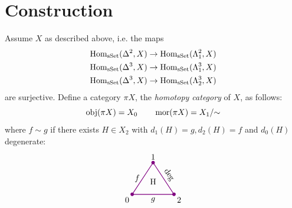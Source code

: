     \section{Construction}
        Assume $X$ as described above, i.e. the maps
        \begin{gather*}
            \operatorname{Hom}_{\operatorname{sSet}}(\Delta^2, X) \to \operatorname{Hom}_{\operatorname{sSet}}(\Lambda^{2}_{1}, X) \\
            \operatorname{Hom}_{\operatorname{sSet}}(\Delta^3, X) \to \operatorname{Hom}_{\operatorname{sSet}}(\Lambda^{3}_{1}, X) \\
            \operatorname{Hom}_{\operatorname{sSet}}(\Delta^3, X) \to \operatorname{Hom}_{\operatorname{sSet}}(\Lambda^{3}_{2}, X)
        \end{gather*}
        are surjective.
        Define a category $\pi X$, the \emph{homotopy category} of $X$, as follows:
        \begin{equation*}
            \operatorname{obj}(\pi X) = X_0 \qquad \operatorname{mor}(\pi X) = {X_1}/{\sim}
        \end{equation*}
        where $f \sim g$ if there exists $H \in X_2$ with $d_1(H) = g, d_2(H) = f$ and $d_0(H)$ degenerate:
        \begin{equation*}
            \begin{tikzpicture}[
                scale=0.9, 
                thick, 
                color=violet, 
                every node/.style={text=black},
                dot/.style={circle, fill=violet, inner sep=1.5pt, outer sep=0pt}
            ]

                \coordinate (O) at (0,0);       %
                \coordinate (A) at (1, 1.5);    %
                \coordinate (B) at (2, 0);      %

                \draw (O) -- node[left] {$f$} (A) 
                    -- node[above, sloped] {$\text{deg}$} (B) 
                    -- node[below] {$g$} cycle;

                \node[dot] at (O) {};
                \node[dot] at (A) {};
                \node[dot] at (B) {};

                \node[below left] at (O) {0};
                \node[above] at (A) {1};
                \node[below right] at (B) {2};

                \node[scale=1.0] at (1, 0.6) {H};

            \end{tikzpicture}          
        \end{equation*}
